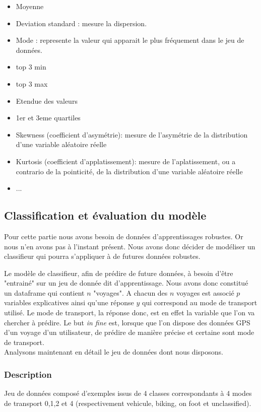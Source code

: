 \documentclass{article}
\begin{document}
\begin{itemize}
    \item Moyenne 
    \item Deviation standard : mesure la dispersion.
    \item Mode : represente la valeur qui apparait le plus fréquement dans le jeu de données.
    \item top 3 min
    \item top 3 max
    \item Etendue des valeurs
    \item 1er et 3eme quartiles
    \item Skewness (coefficient d'asymétrie):  mesure de l’asymétrie de la distribution d’une variable aléatoire réelle
    \item Kurtosis (coefficient d'applatissement):  mesure de l’aplatissement, ou a contrario de la pointicité, de la distribution d’une variable aléatoire réelle
    \item ...
\end{itemize}


\subsection{Classification et évaluation du modèle}

Pour cette partie nous avons besoin de données d'apprentissages robustes. Or nous n'en avons pas à l'instant présent. Nous avons donc décider de modéliser un classifieur qui pourra s'appliquer à de futures données robustes.

Le modèle de classifieur, afin de prédire de future données, à besoin d'être "entrainé" sur un jeu de donnée dit d'apprentissage. Nous avons donc constitué un dataframe qui contient $n$ "voyages". A chacun des $n$ voyages est associé $p$ variables explicatives ainsi qu'une réponse $y$ qui correspond au mode de transport utilisé. Le mode de transport, la réponse donc, est en effet la variable que l'on va chercher à prédire. Le but \textit{in fine} est, lorsque que l'on dispose des données GPS d'un voyage d'un utilisateur, de prédire de manière précise et certaine sont mode de transport.\\

Analysons maintenant en détail le jeu de données dont nous disposons.

\subsubsection{Description} Jeu de données composé d'exemples issus de 4 classes correspondants à 4 modes de transport 0,1,2 et 4 (respectivement vehicule, biking, on foot et unclassified).
\end{document}
